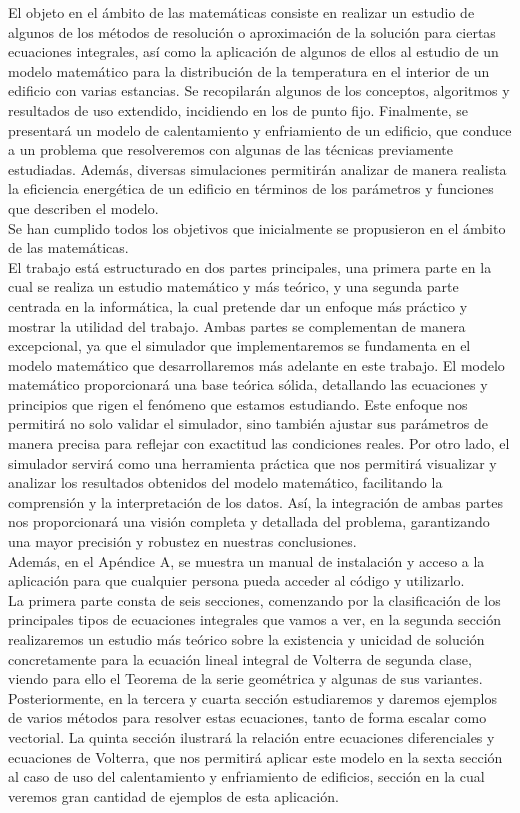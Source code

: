 El objeto en el ámbito de las matemáticas consiste en realizar un estudio de algunos de los métodos de resolución o aproximación de la solución para ciertas ecuaciones integrales, así como la aplicación de algunos de ellos al estudio de un modelo matemático para la distribución de la temperatura en el interior de un edificio con varias estancias. Se recopilarán algunos de los conceptos, algoritmos y resultados de uso extendido, incidiendo en los de punto fijo. Finalmente, se presentará un modelo de calentamiento y enfriamiento de un edificio, que conduce a un problema que resolveremos con algunas de las técnicas previamente estudiadas. Además, diversas simulaciones permitirán analizar de manera realista la eficiencia energética de un edificio en términos de los parámetros y funciones que describen el modelo.\\
Se han cumplido todos los objetivos que inicialmente se propusieron en el ámbito de las matemáticas.\\

El trabajo está estructurado en dos partes principales, una primera parte en la cual se realiza un estudio matemático y más teórico, y una segunda parte centrada en la informática, la cual pretende dar un enfoque más práctico y mostrar la utilidad del trabajo. Ambas partes se complementan de manera excepcional, ya que el simulador que implementaremos se fundamenta en el modelo matemático que desarrollaremos más adelante en este trabajo. El modelo matemático proporcionará una base teórica sólida, detallando las ecuaciones y principios que rigen el fenómeno que estamos estudiando. Este enfoque nos permitirá no solo validar el simulador, sino también ajustar sus parámetros de manera precisa para reflejar con exactitud las condiciones reales. Por otro lado, el simulador servirá como una herramienta práctica que nos permitirá visualizar y analizar los resultados obtenidos del modelo matemático, facilitando la comprensión y la interpretación de los datos. Así, la integración de ambas partes nos proporcionará una visión completa y detallada del problema, garantizando una mayor precisión y robustez en nuestras conclusiones.\\
Además, en el Apéndice A, se muestra un manual de instalación y acceso a la aplicación para que cualquier persona pueda acceder al código y utilizarlo.\\

La primera parte consta de seis secciones, comenzando por la clasificación de los principales tipos de ecuaciones integrales que vamos a ver, en la segunda sección realizaremos un estudio más teórico sobre la existencia y unicidad de solución concretamente para la ecuación lineal integral de Volterra de segunda clase, viendo para ello el Teorema de la serie geométrica y algunas de sus variantes. Posteriormente, en la tercera y cuarta sección estudiaremos y daremos ejemplos de varios métodos para resolver estas ecuaciones, tanto de forma escalar como vectorial. La quinta sección ilustrará la relación entre ecuaciones diferenciales y ecuaciones de Volterra, que nos permitirá aplicar este modelo en la sexta sección al caso de uso del calentamiento y enfriamiento de edificios, sección en la cual veremos gran cantidad de ejemplos de esta aplicación.

